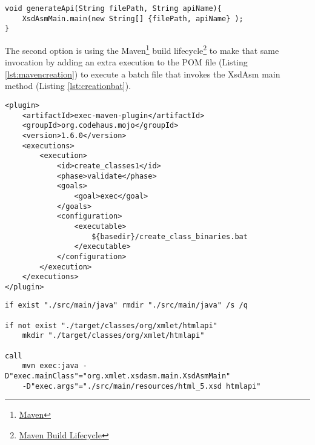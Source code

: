 \bigskip


\begin{minipage}{\linewidth}
\begin{lstlisting}[caption={API creation},captionpos=b,label={lst:directapicreation}]
void generateApi(String filePath, String apiName){
    XsdAsmMain.main(new String[] {filePath, apiName} );    
}
\end{lstlisting}
\end{minipage}

\noindent
The second option is using the Maven\footnote{\href{https://maven.apache.org/}{Maven}} build lifecycle\footnote{\href{https://maven.apache.org/guides/introduction/introduction-to-the-lifecycle.html\#Build_Lifecycle_Basics}{Maven Build Lifecycle}} to make that same invocation by adding an extra execution to the \ac{POM} file (Listing \ref{lst:mavencreation}) to execute a batch file that invokes the XsdAsm main method (Listing \ref{lst:creationbat}). 

\bigskip


\begin{minipage}{\linewidth}
\begin{lstlisting}[caption={Maven API compile classes plugin},captionpos=b,label={lst:mavencreation}]
<plugin>
    <artifactId>exec-maven-plugin</artifactId>
    <groupId>org.codehaus.mojo</groupId>
    <version>1.6.0</version>
    <executions>
        <execution>
            <id>create_classes1</id>
            <phase>validate</phase>
            <goals>
                <goal>exec</goal>
            </goals>
            <configuration>
                <executable>
                    ${basedir}/create_class_binaries.bat
                </executable>
            </configuration>
        </execution>
    </executions>
</plugin>
\end{lstlisting}
\end{minipage}


\begin{minipage}{\linewidth}
\begin{lstlisting}[caption={Maven API creation batch file (create\_class\_binaries.bat)},captionpos=b,label={lst:creationbat}]
if exist "./src/main/java" rmdir "./src/main/java" /s /q

if not exist "./target/classes/org/xmlet/htmlapi" 
    mkdir "./target/classes/org/xmlet/htmlapi"

call 
    mvn exec:java -D"exec.mainClass"="org.xmlet.xsdasm.main.XsdAsmMain" 
    -D"exec.args"="./src/main/resources/html_5.xsd htmlapi"
\end{lstlisting}
\end{minipage}

